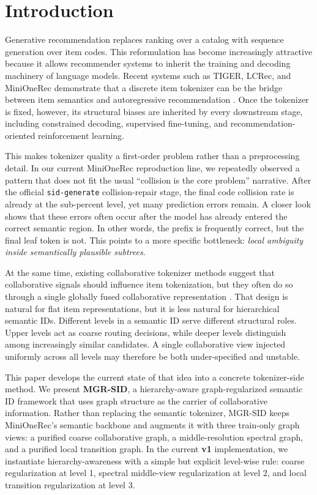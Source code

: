 \section{Introduction}

Generative recommendation replaces ranking over a catalog with sequence generation over item codes. This reformulation has become increasingly attractive because it allows recommender systems to inherit the training and decoding machinery of language models. Recent systems such as TIGER, LCRec, and MiniOneRec demonstrate that a discrete item tokenizer can be the bridge between item semantics and autoregressive recommendation \citep{rajput2023tiger,zheng2023lcrec,kong2025minionerec}. Once the tokenizer is fixed, however, its structural biases are inherited by every downstream stage, including constrained decoding, supervised fine-tuning, and recommendation-oriented reinforcement learning.

This makes tokenizer quality a first-order problem rather than a preprocessing detail. In our current MiniOneRec reproduction line, we repeatedly observed a pattern that does not fit the usual ``collision is the core problem'' narrative. After the official \texttt{sid-generate} collision-repair stage, the final code collision rate is already at the sub-percent level, yet many prediction errors remain. A closer look shows that these errors often occur after the model has already entered the correct semantic region. In other words, the prefix is frequently correct, but the final leaf token is not. This points to a more specific bottleneck: \emph{local ambiguity inside semantically plausible subtrees}.

At the same time, existing collaborative tokenizer methods suggest that collaborative signals should influence item tokenization, but they often do so through a single globally fused collaborative representation \citep{fang2026prism,liang2026resid,wang2026pit,liu2025discrec}. That design is natural for flat item representations, but it is less natural for hierarchical semantic IDs. Different levels in a semantic ID serve different structural roles. Upper levels act as coarse routing decisions, while deeper levels distinguish among increasingly similar candidates. A single collaborative view injected uniformly across all levels may therefore be both under-specified and unstable.

This paper develops the current state of that idea into a concrete tokenizer-side method. We present \textbf{MGR-SID}, a hierarchy-aware graph-regularized semantic ID framework that uses graph structure as the carrier of collaborative information. Rather than replacing the semantic tokenizer, MGR-SID keeps MiniOneRec's semantic \rqvae{} backbone and augments it with three train-only graph views: a purified coarse collaborative graph, a middle-resolution spectral graph, and a purified local transition graph. In the current \textbf{v1} implementation, we instantiate hierarchy-awareness with a simple but explicit level-wise rule: coarse regularization at level 1, spectral middle-view regularization at level 2, and local transition regularization at level 3.

